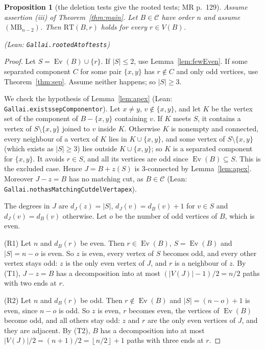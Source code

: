 \documentclass[11pt]{amsart}
\newtheorem{proposition}[theorem]{Proposition}
\theoremstyle{definition}
\theoremstyle{remark}
\renewcommand{\_}{\oldunderscore\allowbreak}
\newcommand{\lean}[1]{\textup{(Lean: {\small\texttt{#1}})}}
\newcommand{\leanst}[1]{\par{\raggedright\small\textup{(Lean: \texttt{#1})}\par}}
\newcommand{\cC}{\mathcal{C}}
\newcommand{\fl}[1]{\left\lfloor #1\right\rfloor}
\newcommand{\MBU}{\mathrm{MB}}
\newcommand{\RT}{\mathrm{RT}}
\newcommand{\Ev}{\operatorname{Ev}}
\begin{document}
\begin{proposition}[the deletion tests give the rooted tests; MR p.~129]\label{prop:rootedFromTests}
Assume assertion \textup{(iii)} of Theorem~\ref{thm:main}. Let $B\in\cC$ have order $n$ and assume
$(\MBU_{n-2})$. Then $\RT(B,r)$ holds for every $r\in V(B)$.
\leanst{Gallai.rootedAt\_of\_tests}
\end{proposition}

\begin{proof}
Let $S=\Ev(B)\cup\{r\}$. If $|S|\le2$, use Lemma~\ref{lem:fewEven}. If some separated component $C$
for some pair $\{x,y\}$ has $r\notin C$ and only odd vertices, use Theorem~\ref{thm:sep}. Assume
neither happens; so $|S|\ge3$.

We check the hypothesis of Lemma~\ref{lem:apex} \lean{Gallai.exists\_sepComponent\_or}. Let
$x\ne y$, $v\notin\{x,y\}$, and let $K$ be the vertex set of the component of $B-\{x,y\}$ containing
$v$. If $K$ meets $S$, it contains a vertex of $S\setminus\{x,y\}$ joined to $v$ inside $K$.
Otherwise $K$ is nonempty and connected, every neighbour of a vertex of $K$ lies in $K\cup\{x,y\}$,
and some vertex of $S\setminus\{x,y\}$ (which exists as $|S|\ge3$) lies outside $K\cup\{x,y\}$; so
$K$ is a separated component for $\{x,y\}$. It avoids $r\in S$, and all its vertices are odd since
$\Ev(B)\subseteq S$. This is the excluded case. Hence $J=B+z(S)$ is $3$-connected by
Lemma~\ref{lem:apex}. Moreover $J-z=B$ has no matching cut, as $B\in\cC$
\lean{Gallai.not\_hasMatchingCut\_delVert\_apex}.

The degrees in $J$ are $d_J(z)=|S|$, $d_J(v)=d_B(v)+1$ for $v\in S$ and $d_J(v)=d_B(v)$ otherwise.
Let $o$ be the number of odd vertices of $B$, which is even.

(R1) Let $n$ and $d_B(r)$ be even. Then $r\in\Ev(B)$, $S=\Ev(B)$ and $|S|=n-o$ is even. So $z$ is
even, every vertex of $S$ becomes odd, and every other vertex stays odd: $z$ is the only even vertex
of $J$, and $r$ is a neighbour of $z$. By (T1), $J-z=B$ has a decomposition into at most
$(|V(J)|-1)/2=n/2$ paths with two ends at $r$.

(R2) Let $n$ and $d_B(r)$ be odd. Then $r\notin\Ev(B)$ and $|S|=(n-o)+1$ is even, since $n-o$ is odd.
So $z$ is even, $r$ becomes even, the vertices of $\Ev(B)$ become odd, and all others stay odd: $z$
and $r$ are the only even vertices of $J$, and they are adjacent. By (T2), $B$ has a decomposition
into at most $|V(J)|/2=(n+1)/2=\fl{n/2}+1$ paths with three ends at $r$.
\end{proof}
\end{document}
